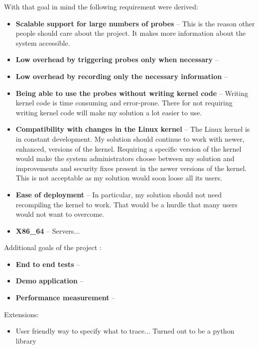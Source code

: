     With that goal in mind the following requirement were derived:
    \begin{itemize}
        \item \textbf{Scalable support for large numbers of probes} -- This is the reason other people should care about the project. It makes more information about the system accessible.
        \item \textbf{Low overhead by triggering probes only when necessary} -- %
        \item \textbf{Low overhead by recording only the necessary information} -- %
        \item \textbf{Being able to use the probes without writing kernel code} -- Writing kernel code is time consuming and error-prone. There for not requiring writing kernel code will make my solution a lot easier to use.
        \item \textbf{Compatibility with changes in the Linux kernel} -- The Linux kernel is in constant development. My solution should continue to work with newer, enhanced, versions of the kernel. Requiring a specific version of the kernel would make the system administrators choose between my solution and improvements and security fixes present in the newer versions of the kernel. This is not acceptable as my solution would soon loose all its users.
        \item \textbf{Ease of deployment} -- In particular, my solution should not need recompiling the kernel to work. That would be a hurdle that many users would not want to overcome.
        \item \textbf{X86_64} -- Servers...
    \end{itemize}

    Additional goals of the project :
    \begin{itemize}
        \item \textbf{End to end tests} -- 
        \item \textbf{Demo application} --
        \item \textbf{Performance measurement} --
    \end{itemize}

    Extensions:
    \begin{itemize}
        \item User friendly way to specify what to trace... Turned out to be a python library
    \end{itemize}

